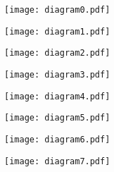 \documentclass[10pt,a4paper,fleqn]{article}
\begin{document}
  \renewcommand{\labelenumi}{(\alph{enumi})}
  \renewcommand\headrule{\vspace{+2pt}\hrule}
  \newcommand{\solved}{\[\hfill\Box\]}
  \setlength{\headheight}{2.5\baselineskip}
  \pagestyle{fancyplain}

  
  \texttt{[image: diagram0.pdf]}
 
\texttt{[image: diagram1.pdf]}
 
\texttt{[image: diagram2.pdf]}
 
\texttt{[image: diagram3.pdf]}
 
\texttt{[image: diagram4.pdf]}
 
\texttt{[image: diagram5.pdf]}
 
\texttt{[image: diagram6.pdf]}
 
\texttt{[image: diagram7.pdf]}
 

  
\end{document}

